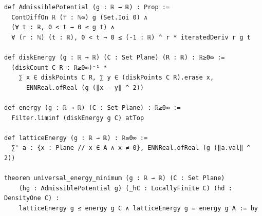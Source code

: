 \begin{Verbatim}[fontsize=\scriptsize,frame=single,framesep=1.5mm]
def AdmissiblePotential (g : ℝ → ℝ) : Prop :=
  ContDiffOn ℝ (⊤ : ℕ∞) g (Set.Ioi 0) ∧
  (∀ t : ℝ, 0 < t → 0 ≤ g t) ∧
  ∀ (r : ℕ) (t : ℝ), 0 < t → 0 ≤ (-1 : ℝ) ^ r * iteratedDeriv r g t

def diskEnergy (g : ℝ → ℝ) (C : Set Plane) (R : ℝ) : ℝ≥0∞ :=
  (diskCount C R : ℝ≥0∞)⁻¹ *
    ∑ x ∈ diskPoints C R, ∑ y ∈ (diskPoints C R).erase x,
      ENNReal.ofReal (g (‖x - y‖ ^ 2))

def energy (g : ℝ → ℝ) (C : Set Plane) : ℝ≥0∞ :=
  Filter.liminf (diskEnergy g C) atTop

def latticeEnergy (g : ℝ → ℝ) : ℝ≥0∞ :=
  ∑' a : {x : Plane // x ∈ A ∧ x ≠ 0}, ENNReal.ofReal (g (‖a.val‖ ^ 2))

theorem universal_energy_minimum (g : ℝ → ℝ) (C : Set Plane)
    (hg : AdmissiblePotential g) (_hC : LocallyFinite C) (hd : DensityOne C) :
    latticeEnergy g ≤ energy g C ∧ latticeEnergy g = energy g A := by
\end{Verbatim}
